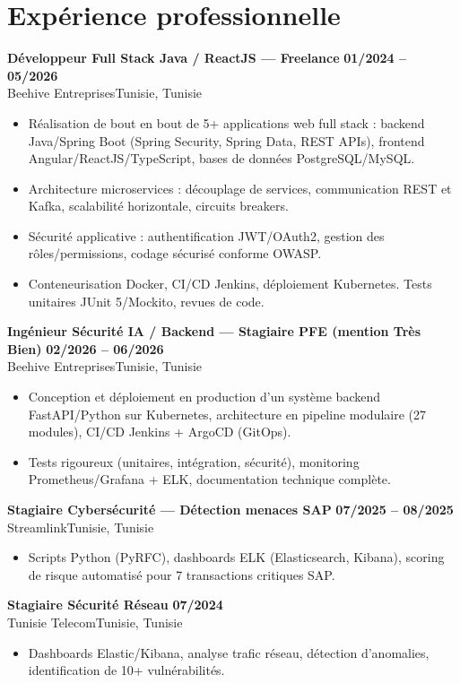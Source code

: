 \documentclass[a4paper,10pt]{article}
\newcommand{\cventry}[4]{\textbf{#1} \hfill \textbf{#4}\\[0.5pt]#2{\ifx\relax#3\relax\else, #3\fi}\par\vspace{1pt}}
\begin{document}
\section{Expérience professionnelle}
\cventry{Développeur Full Stack Java / ReactJS --- Freelance}{Beehive Entreprises}{Tunisie}{01/2024 -- 05/2026}
\begin{itemize}
  \item Réalisation de bout en bout de 5+ applications web full stack : backend Java/Spring Boot (Spring Security, Spring Data, REST APIs), frontend Angular/ReactJS/TypeScript, bases de données PostgreSQL/MySQL.
  \item Architecture microservices : découplage de services, communication REST et Kafka, scalabilité horizontale, circuits breakers.
  \item Sécurité applicative : authentification JWT/OAuth2, gestion des rôles/permissions, codage sécurisé conforme OWASP.
  \item Conteneurisation Docker, CI/CD Jenkins, déploiement Kubernetes. Tests unitaires JUnit 5/Mockito, revues de code.
\end{itemize}
\cventry{Ingénieur Sécurité IA / Backend --- Stagiaire PFE (mention Très Bien)}{Beehive Entreprises}{Tunisie}{02/2026 -- 06/2026}
\begin{itemize}
  \item Conception et déploiement en production d'un système backend FastAPI/Python sur Kubernetes, architecture en pipeline modulaire (27 modules), CI/CD Jenkins + ArgoCD (GitOps).
  \item Tests rigoureux (unitaires, intégration, sécurité), monitoring Prometheus/Grafana + ELK, documentation technique complète.
\end{itemize}
\cventry{Stagiaire Cybersécurité --- Détection menaces SAP}{Streamlink}{Tunisie}{07/2025 -- 08/2025}
\begin{itemize}
  \item Scripts Python (PyRFC), dashboards ELK (Elasticsearch, Kibana), scoring de risque automatisé pour 7 transactions critiques SAP.
\end{itemize}
\cventry{Stagiaire Sécurité Réseau}{Tunisie Telecom}{Tunisie}{07/2024}
\begin{itemize}
  \item Dashboards Elastic/Kibana, analyse trafic réseau, détection d'anomalies, identification de 10+ vulnérabilités.
\end{itemize}
\end{document}
